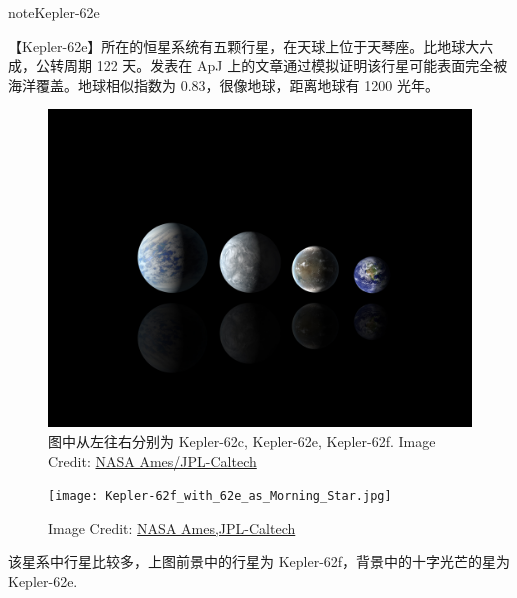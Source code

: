 \documentclass[letterpaper,10pt,english]{sphinxmanual}
\begin{document}
\begin{notice}{note}{Kepler-62e}

【Kepler-62e】所在的恒星系统有五颗行星，在天球上位于天琴座。比地球大六成，公转周期 122 天。发表在 ApJ 上的文章通过模拟证明该行星可能表面完全被海洋覆盖。地球相似指数为 0.83，很像地球，距离地球有 1200 光年。
\begin{figure}[htbp]
\centering
\capstart

\includegraphics{Relative_sizes_of_all_of_the_habitable-zone_planets_discovered_to_date_alongside_Earth.jpg}
\caption{图中从左往右分别为 Kepler-62c, Kepler-62e, Kepler-62f. Image Credit: \href{http://en.wikipedia.org/wiki/File:Relative\_sizes\_of\_all\_of\_the\_habitable-zone\_planets\_discovered\_to\_date\_alongside\_Earth.jpg}{NASA Ames/JPL-Caltech}}\end{figure}
\begin{figure}[htbp]
\centering
\capstart

\texttt{[image: Kepler-62f\_with\_62e\_as\_Morning\_Star.jpg]}
\caption{Image Credit: \href{http://en.wikipedia.org/wiki/File:Kepler-62f\_with\_62e\_as\_Morning\_Star.jpg}{NASA Ames,JPL-Caltech}}\end{figure}

该星系中行星比较多，上图前景中的行星为 Kepler-62f，背景中的十字光芒的星为 Kepler-62e.
\end{notice}
\end{document}
